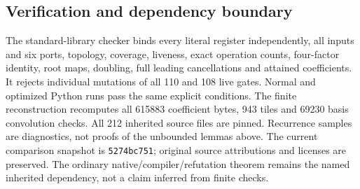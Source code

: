 \subsection{Verification and dependency boundary}
The standard-library checker binds every literal register independently, all
inputs and six ports, topology, coverage, liveness, exact operation counts,
four-factor identity, root maps, doubling, full leading cancellations and
attained coefficients. It rejects individual mutations of all 110 and 108 live
gates. Normal and optimized Python runs pass the same explicit conditions.
The finite reconstruction recomputes all 615883 coefficient bytes, 943 tiles and
69230 basis convolution checks. All 212 inherited source files are pinned.
Recurrence samples are diagnostics, not proofs of the unbounded lemmas above.
The current comparison snapshot is
\texttt{5274bc751}; original source attributions
and licenses are preserved. The ordinary native/compiler/refutation theorem
remains the named inherited dependency, not a claim inferred from finite checks.
